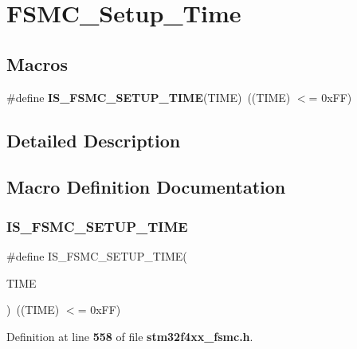 \section{F\+S\+M\+C\+\_\+\+Setup\+\_\+\+Time}
\label{group__FSMC__Setup__Time}
\subsection*{Macros}
\begin{DoxyCompactItemize}
\item 
\#define \textbf{ I\+S\+\_\+\+F\+S\+M\+C\+\_\+\+S\+E\+T\+U\+P\+\_\+\+T\+I\+ME}(T\+I\+ME)~((T\+I\+ME) $<$= 0x\+F\+F)
\end{DoxyCompactItemize}


\subsection{Detailed Description}


\subsection{Macro Definition Documentation}
\mbox{\label{group__FSMC__Setup__Time_ga4f2fbb8f6ec492cc241a49c468e0d98d}} 
\subsubsection{I\+S\+\_\+\+F\+S\+M\+C\+\_\+\+S\+E\+T\+U\+P\+\_\+\+T\+I\+ME}
{\footnotesize\ttfamily \#define I\+S\+\_\+\+F\+S\+M\+C\+\_\+\+S\+E\+T\+U\+P\+\_\+\+T\+I\+ME(\begin{DoxyParamCaption}\item[{}]{T\+I\+ME }\end{DoxyParamCaption})~((T\+I\+ME) $<$= 0x\+F\+F)}



Definition at line \textbf{ 558} of file \textbf{ stm32f4xx\+\_\+fsmc.\+h}.

